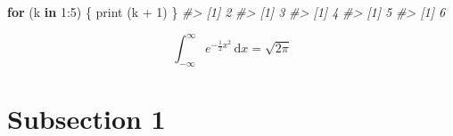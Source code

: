 \documentclass{source/tex/templates/maththesis}
\newenvironment{Shaded}{\begin{snugshade}}{\end{snugshade}}
\newcommand{\CommentTok}[1]{\textcolor[rgb]{0.56,0.35,0.01}{\textit{#1}}}
\newcommand{\ControlFlowTok}[1]{\textcolor[rgb]{0.13,0.29,0.53}{\textbf{#1}}}
\newcommand{\DecValTok}[1]{\textcolor[rgb]{0.00,0.00,0.81}{#1}}
\newcommand{\FunctionTok}[1]{\textcolor[rgb]{0.00,0.00,0.00}{#1}}
\newcommand{\NormalTok}[1]{#1}
\newcommand{\SpecialCharTok}[1]{\textcolor[rgb]{0.00,0.00,0.00}{#1}}
\begin{document}
\begin{Shaded}
\begin{Highlighting}[]
\ControlFlowTok{for}\NormalTok{ (k }\ControlFlowTok{in} \DecValTok{1}\SpecialCharTok{:}\DecValTok{5}\NormalTok{) \{}
  \FunctionTok{print}\NormalTok{ (k }\SpecialCharTok{+} \DecValTok{1}\NormalTok{)}
\NormalTok{\}}
\CommentTok{\#\textgreater{} [1] 2}
\CommentTok{\#\textgreater{} [1] 3}
\CommentTok{\#\textgreater{} [1] 4}
\CommentTok{\#\textgreater{} [1] 5}
\CommentTok{\#\textgreater{} [1] 6}
\end{Highlighting}
\end{Shaded}

\[
 \int_{-\infty}^{\infty} e^{-\frac{1}{2}x^2}\,\text{d}x = \sqrt{2\pi}
\]

\hypertarget{subsection-1}{%
\section{Subsection 1}\label{subsection-1}}
\end{document}
